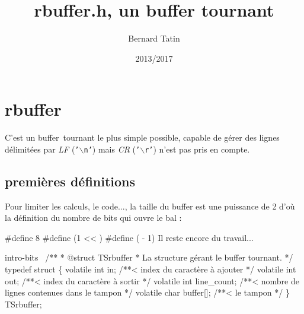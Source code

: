 \documentclass[10pt]{article}%
\author{Bernard Tatin}
\date{2013/2017}
\title{rbuffer.h, un buffer tournant}
\begin{document}
\pagestyle{noweb}
\maketitle
\tableofcontents
\section{rbuffer}

C'est un {\Tt{}buffer\ tournant\nwendquote} le plus simple possible, capable de gérer des lignes
délimitées par \emph{LF} (\texttt{'$\backslash$n'}) mais \emph{CR} (\texttt{'$\backslash$r'}) n'est pas pris en compte.

\subsection{premières définitions}
Pour limiter les calculs, le code..., la taille du buffer est une puissance de 2
d'où la définition du nombre de bits qui ouvre le bal :

\endmoddef\nwstartdeflinemarkup{}\nwenddeflinemarkup
#define    8
#define     (1 << )
#define     ( - 1)
\eatline
{}\nwendcode{}\nwdocspar
\nwenddocs{}\nwdocspar
Il reste encore du travail...

\nwenddocs{}\endmoddef\nwstartdeflinemarkup\nwenddeflinemarkup
\LA{}intro-bits~{\nwtagstyle{}}\RA{}
/**
 * @struct TSrbuffer
 * La structure gérant le buffer tournant.
 */
typedef struct \{
    volatile int in; /**< index du caractère à ajouter */
    volatile int out; /**< index du caractère à sortir */
    volatile int line_count; /**< nombre de lignes contenues dans le tampon */
    volatile char buffer[]; /**< le tampon */
\} TSrbuffer;
\end{document}
